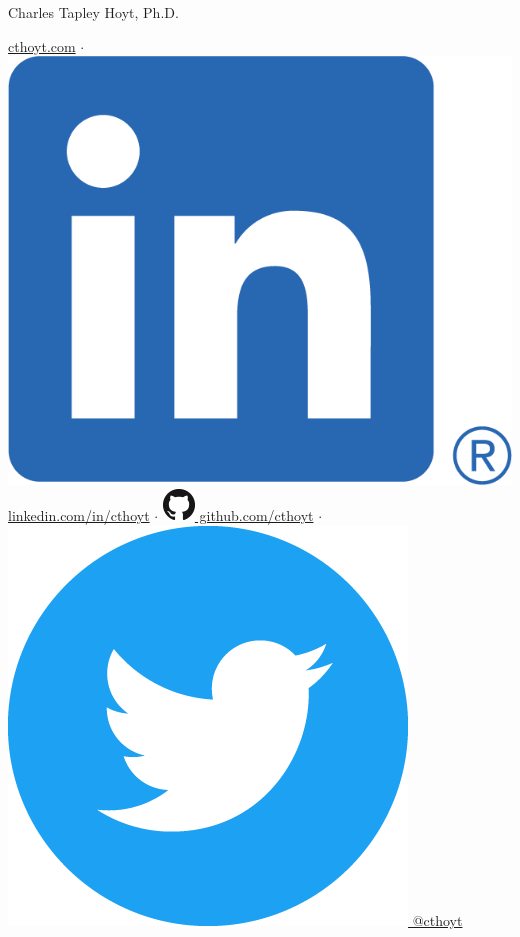 \documentclass[11pt,a4paper,sans]{moderncv} %
\begin{document}
{\Huge Charles Tapley Hoyt, Ph.D.}

\vspace{3mm}

\href{https://cthoyt.com}{cthoyt.com}
$\cdot$
\href{https://linkedin.com/in/cthoyt}{\includegraphics[scale=0.055]{img/LI-In-Bug} linkedin.com/in/cthoyt}
$\cdot$
\href{https://github.com/cthoyt}{\includegraphics[scale=0.25]{img/GitHub-Mark-32px} github.com/cthoyt}
$\cdot$
\href{https://twitter.com/cthoyt}{\includegraphics[scale=0.02]{img/Twitter_Social_Icon_Circle_Color} @cthoyt}
\end{document}
